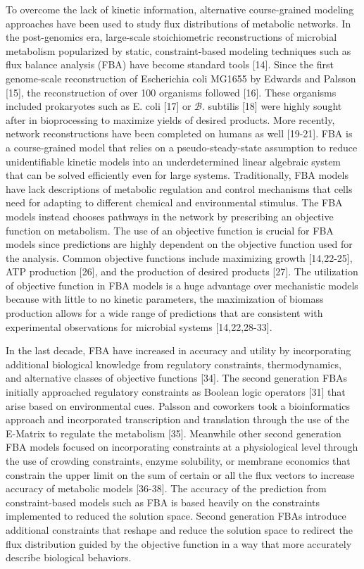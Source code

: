 \documentclass[12pt]{article}
\begin{document}
To overcome the lack of kinetic information, alternative course-grained modeling approaches have been used to study flux distributions of metabolic networks. In the post-genomics era, large-scale stoichiometric reconstructions of microbial metabolism popularized by static, constraint-based modeling techniques such as flux balance analysis (FBA) have become standard tools [14]. Since the first genome-scale reconstruction of Escherichia coli MG1655 by Edwards and Palsson [15], the reconstruction of over 100 organisms followed [16]. These organisms included prokaryotes such as E. coli [17] or $\mathcal{B}$. subtilis [18] were highly sought after in bioprocessing to maximize yields of desired products. More recently, network reconstructions have been completed on humans as well [19-21]. FBA is a course-grained model that relies on a pseudo-steady-state assumption to reduce unidentifiable kinetic models into an underdetermined linear algebraic system that can be solved efficiently even for large systems. Traditionally, FBA models have lack descriptions of metabolic regulation and control mechanisms that cells need for adapting to different chemical and environmental stimulus. The FBA models instead chooses pathways in the network by prescribing an objective function on metabolism. The use of an objective function is crucial for FBA models since predictions are highly dependent on the objective function used for the analysis. Common objective functions include maximizing growth [14,22-25], ATP production [26], and the production of desired products [27]. The utilization of objective function in FBA models is a huge advantage over mechanistic models because with little to no kinetic parameters, the maximization of biomass production allows for a wide range of predictions that are consistent with experimental observations for microbial systems [14,22,28-33].

In the last decade, FBA have increased in accuracy and utility by incorporating additional biological knowledge from regulatory constraints, thermodynamics, and alternative classes of objective functions [34]. The second generation FBAs initially approached regulatory constraints as Boolean logic operators [31] that arise based on environmental cues. Palsson and coworkers took a bioinformatics approach and incorporated transcription and translation through the use of the E-Matrix to regulate the metabolism [35]. Meanwhile other second generation FBA models focused on incorporating constraints at a physiological level through the use of crowding constraints, enzyme solubility, or membrane economics that constrain the upper limit on the sum of certain or all the flux vectors to increase accuracy of metabolic models [36-38]. The accuracy of the prediction from constraint-based models such as FBA is based heavily on the constraints implemented to reduced the solution space. Second generation FBAs introduce additional constraints that reshape and reduce the solution space to redirect the flux distribution guided by the objective function in a way that more accurately describe biological behaviors. 
\end{document}
